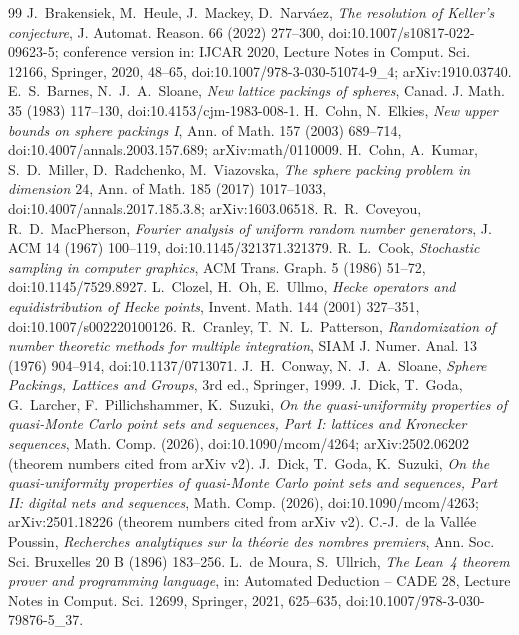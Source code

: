 \documentclass[11pt]{amsart}
\theoremstyle{definition}
\theoremstyle{plain}
\begin{document}
\begin{thebibliography}{99}
 J.~Brakensiek, M.~Heule, J.~Mackey, D.~Narv\'aez, \emph{The resolution of Keller's conjecture}, J. Automat. Reason. 66 (2022) 277--300, doi:10.1007/s10817-022-09623-5; conference version in: IJCAR 2020, Lecture Notes in Comput. Sci. 12166, Springer, 2020, 48--65, doi:10.1007/978-3-030-51074-9\_4; arXiv:1910.03740.
 E.~S.~Barnes, N.~J.~A.~Sloane, \emph{New lattice packings of spheres}, Canad. J. Math. 35 (1983) 117--130, doi:10.4153/cjm-1983-008-1.
 H.~Cohn, N.~Elkies, \emph{New upper bounds on sphere packings I}, Ann. of Math. 157 (2003) 689--714, doi:10.4007/annals.2003.157.689; arXiv:math/0110009.
 H.~Cohn, A.~Kumar, S.~D.~Miller, D.~Radchenko, M.~Viazovska, \emph{The sphere packing problem in dimension $24$}, Ann. of Math. 185 (2017) 1017--1033, doi:10.4007/annals.2017.185.3.8; arXiv:1603.06518.
 R.~R.~Coveyou, R.~D.~MacPherson, \emph{Fourier analysis of uniform random number generators}, J. ACM 14 (1967) 100--119, doi:10.1145/321371.321379.
 R.~L.~Cook, \emph{Stochastic sampling in computer graphics}, ACM Trans. Graph. 5 (1986) 51--72, doi:10.1145/7529.8927.
 L.~Clozel, H.~Oh, E.~Ullmo, \emph{Hecke operators and equidistribution of Hecke points}, Invent. Math. 144 (2001) 327--351, doi:10.1007/s002220100126.
 R.~Cranley, T.~N.~L.~Patterson, \emph{Randomization of number theoretic methods for multiple integration}, SIAM J. Numer. Anal. 13 (1976) 904--914, doi:10.1137/0713071.
 J.~H.~Conway, N.~J.~A.~Sloane, \emph{Sphere Packings, Lattices and Groups}, 3rd ed., Springer, 1999.
 J.~Dick, T.~Goda, G.~Larcher, F.~Pillichshammer, K.~Suzuki, \emph{On the quasi-uniformity properties of quasi-Monte Carlo point sets and sequences, Part I: lattices and Kronecker sequences}, Math. Comp. (2026), doi:10.1090/mcom/4264; arXiv:2502.06202 (theorem numbers cited from arXiv v2).
 J.~Dick, T.~Goda, K.~Suzuki, \emph{On the quasi-uniformity properties of quasi-Monte Carlo point sets and sequences, Part II: digital nets and sequences}, Math. Comp. (2026), doi:10.1090/mcom/4263; arXiv:2501.18226 (theorem numbers cited from arXiv v2).
 C.-J.~de la Vall\'ee Poussin, \emph{Recherches analytiques sur la th\'eorie des nombres premiers}, Ann. Soc. Sci. Bruxelles 20 B (1896) 183--256.
 L.~de Moura, S.~Ullrich, \emph{The Lean~4 theorem prover and programming language}, in: Automated Deduction -- CADE 28, Lecture Notes in Comput. Sci. 12699, Springer, 2021, 625--635, doi:10.1007/978-3-030-79876-5\_37.

\end{thebibliography}
\end{document}
